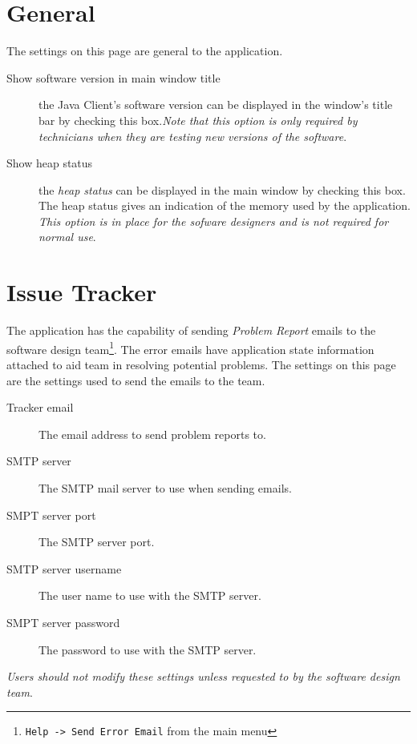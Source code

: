 \section{General}
The settings on this page are general to the application.
\begin{description}
  \item[Show software version in main window title] the Java Client's software
    version can be displayed in the window's title bar by checking this
    box.\textit{Note that this option is only required by technicians when they
      are testing new versions of the software}.
  \item[Show heap status] the \emph{heap status} can be displayed in the main
    window by checking this box. The heap status gives an indication of the
    memory used by the application. \textit{This option is in place for the
      sofware designers and is not required for normal use}.
\end{description}

\section{Issue Tracker}
The application has the capability of sending \emph{Problem Report} emails to
the software design team\footnote{\texttt{Help -> Send Error Email} from the
  main menu}. The error emails have application state information attached to
aid team in resolving potential problems. The settings on this page are the
settings used to send the emails to the team.

\begin{description}
  \item[Tracker email] The email address to send problem reports to.
  \item[SMTP server] The SMTP mail server to use when sending emails.
  \item[SMPT server port] The SMTP server port.
  \item[SMTP server username] The user name to use with the SMTP server.
  \item[SMPT server password] The password to use with the SMTP server.
\end{description}
\textit{Users should not modify these settings unless requested to by the software
  design team}.

